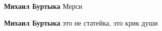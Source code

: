 \begin{itemize}
\begin{itemize}
 
\textbf{Михаил Буртыка} Мерси

 
\textbf{Михаил Буртыка} это не статейка, это крик души
\end{itemize}

\end{itemize}

